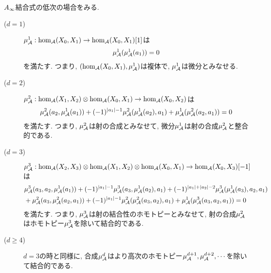 \documentclass[aspectratio=169, dvipdfmx, 8pt, notheorems, uplatex]{beamer}
\begin{document}
\begin{frame}
  $A_\infty$結合式の低次の場合をみる. 

  \begin{remark} \label{rem_low_Ainf_associativity}
    \begin{description}
      \item[($d=1$)] $\mu^1_{\mathcal{A}} : \hom_{\mathcal{A}}(X_0,X_1) \to \hom_{\mathcal{A}}(X_0,X_1)[1]$は
      \begin{align*}
        \mu^1_{\mathcal{A}} (\mu^1_{\mathcal{A}} (a_1))
        = 0
      \end{align*}
      を満たす. 
      つまり, $(\hom_{\mathcal{A}}(X_0,X_1), \mu^1_{\mathcal{A}})$は複体で, $\mu^1_{\mathcal{A}}$は微分とみなせる. 
      \item[($d=2$)] $\mu^2_{\mathcal{A}} : \hom_{\mathcal{A}}(X_1,X_2) \otimes \hom_{\mathcal{A}}(X_0,X_1) \to \hom_{\mathcal{A}}(X_0,X_2)$は 
      \begin{align*}
        \mu^2_{\mathcal{A}}(a_2, \mu^1_{\mathcal{A}}(a_1)) + (-1)^{|a_1|-1} \mu^2_{\mathcal{A}}(\mu^1_{\mathcal{A}}(a_2), a_1) + \mu^1_{\mathcal{A}}(\mu^2_{\mathcal{A}}(a_2, a_1))
        = 0
      \end{align*}
      を満たす. 
      つまり, $\mu^2_{\mathcal{A}}$は射の合成とみなせて, 微分$\mu^1_{\mathcal{A}}$は射の合成$\mu^2_{\mathcal{A}}$と整合的である. 
      \item[($d=3$)] $\mu^3_{\mathcal{A}} : \hom_{\mathcal{A}}(X_2,X_3) \otimes \hom_{\mathcal{A}}(X_1,X_2) \otimes \hom_{\mathcal{A}}(X_0,X_1) \to \hom_{\mathcal{A}}(X_0,X_3)[-1]$は
      \begin{align*}
        &\mu^3_{\mathcal{A}}(a_3, a_2, \mu^1_{\mathcal{A}}(a_1)) + (-1)^{|a_1|-1} \mu^3_{\mathcal{A}}(a_3, \mu^1_{\mathcal{A}}(a_2), a_1) + (-1)^{|a_1|+|a_2|-2} \mu^3_{\mathcal{A}}(\mu^1_{\mathcal{A}}(a_3), a_2, a_1) \\
        &+ \mu^2_{\mathcal{A}}(a_3, \mu^2_{\mathcal{A}}(a_2,a_1)) + (-1)^{|a_1|-1} \mu^2_{\mathcal{A}}(\mu^2_{\mathcal{A}}(a_3,a_2), a_1) + \mu^1_{\mathcal{A}}(\mu^3_{\mathcal{A}}(a_3,a_2,a_1)) 
        = 0
      \end{align*}
      を満たす. 
      つまり, $\mu^3_{\mathcal{A}}$は射の結合性のホモトピーとみなせて, 射の合成$\mu^2_{\mathcal{A}}$はホモトピー$\mu^3_{\mathcal{A}}$を除いて結合的である.
      \item[($d \geq 4$)] $d=3$の時と同様に, 合成$\mu^d_{\mathcal{A}}$はより高次のホモトピー$\mu^{d+1}_{\mathcal{A}},\mu^{d+2}_{\mathcal{A}},\cdots$を除いて結合的である. 
    \end{description}
  \end{remark}
\end{frame}
\end{document}
